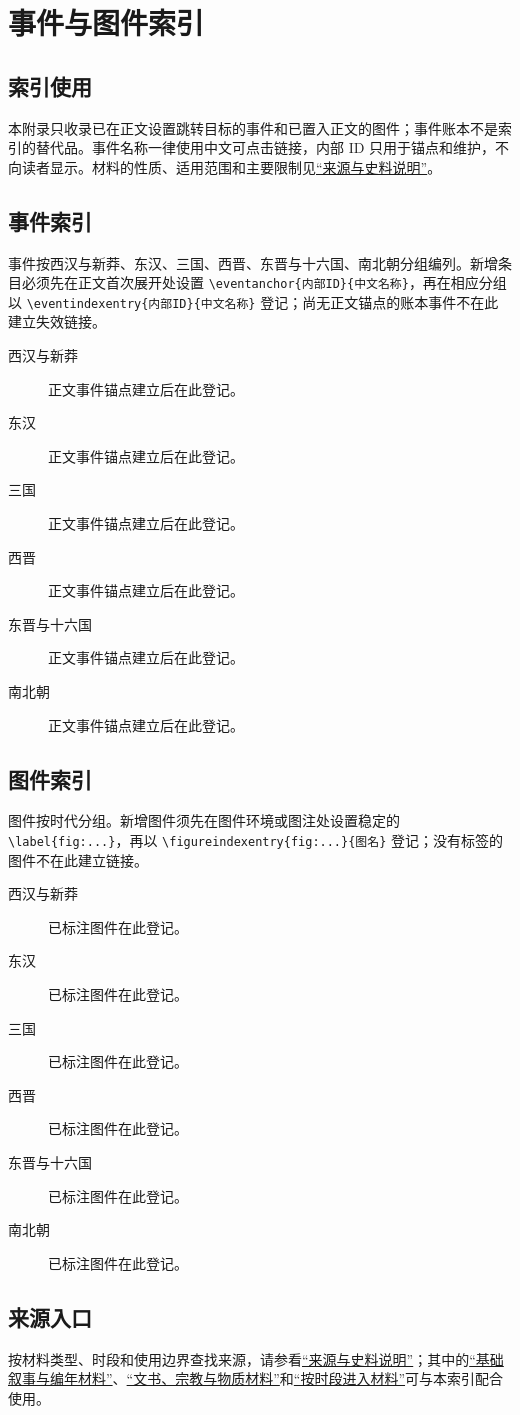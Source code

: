 \chapter{事件与图件索引}
\label{app:index}

\section{索引使用}
\label{app:index:guide}

本附录只收录已在正文设置跳转目标的事件和已置入正文的图件；事件账本不是索引的替代品。事件名称一律使用中文可点击链接，内部 ID 只用于锚点和维护，不向读者显示。材料的性质、适用范围和主要限制见\hyperref[app:sources]{“来源与史料说明”}。

\section{事件索引}
\label{app:index:events}

事件按西汉与新莽、东汉、三国、西晋、东晋与十六国、南北朝分组编列。新增条目必须先在正文首次展开处设置 \verb|\eventanchor{内部ID}{中文名称}|，再在相应分组以 \verb|\eventindexentry{内部ID}{中文名称}| 登记；尚无正文锚点的账本事件不在此建立失效链接。

\begin{description}
  \item[西汉与新莽] 正文事件锚点建立后在此登记。
  \item[东汉] 正文事件锚点建立后在此登记。
  \item[三国] 正文事件锚点建立后在此登记。
  \item[西晋] 正文事件锚点建立后在此登记。
  \item[东晋与十六国] 正文事件锚点建立后在此登记。
  \item[南北朝] 正文事件锚点建立后在此登记。
\end{description}

\section{图件索引}
\label{app:index:figures}

图件按时代分组。新增图件须先在图件环境或图注处设置稳定的 \verb|\label{fig:...}|，再以 \verb|\figureindexentry{fig:...}{图名}| 登记；没有标签的图件不在此建立链接。

\begin{description}
  \item[西汉与新莽] 已标注图件在此登记。
  \item[东汉] 已标注图件在此登记。
  \item[三国] 已标注图件在此登记。
  \item[西晋] 已标注图件在此登记。
  \item[东晋与十六国] 已标注图件在此登记。
  \item[南北朝] 已标注图件在此登记。
\end{description}

\section{来源入口}
\label{app:index:sources}

按材料类型、时段和使用边界查找来源，请参看\hyperref[app:sources]{“来源与史料说明”}；其中的\hyperref[app:sources:narrative]{“基础叙事与编年材料”}、\hyperref[app:sources:documents]{“文书、宗教与物质材料”}和\hyperref[app:sources:periods]{“按时段进入材料”}可与本索引配合使用。

